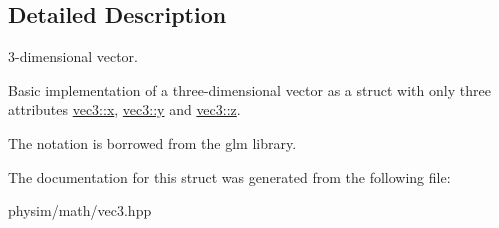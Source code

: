 \subsection{Detailed Description}
3-\/dimensional vector. 

Basic implementation of a three-\/dimensional vector as a struct with only three attributes \hyperlink{structphysim_1_1math_1_1vec3_a1e6e6b869b8631d35d47f729d0e7b133}{vec3\+::x}, \hyperlink{structphysim_1_1math_1_1vec3_a9d8e3bdd74443a7bc8cf45c85d1d008a}{vec3\+::y} and \hyperlink{structphysim_1_1math_1_1vec3_a541880e43f1a7bd1b2c4524891a51727}{vec3\+::z}.

The notation is borrowed from the \textquotesingle{}glm\textquotesingle{} library. 

The documentation for this struct was generated from the following file\+:\begin{DoxyCompactItemize}
\item 
physim/math/vec3.\+hpp\end{DoxyCompactItemize}
